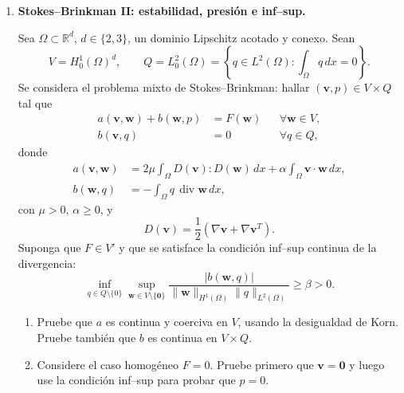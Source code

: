 \documentclass[11pt]{article}
\newcommand{\R}{\mathbb{R}}
\DeclareMathOperator{\diver}{div}
\begin{document}
\begin{enumerate}[label=\textbf{\arabic*.}, leftmargin=*]

\item \textbf{Stokes--Brinkman II: estabilidad, presi\'on e inf--sup.}

Sea $\Omega\subset\R^d$, $d\in\{2,3\}$, un dominio Lipschitz acotado y conexo. Sean
\begin{equation*}
    V=H^1_0(\Omega)^d,
    \qquad
    Q=L^2_0(\Omega)=\left\{q\in L^2(\Omega):\int_\Omega q\,dx=0\right\}.
\end{equation*}
Se considera el problema mixto de Stokes--Brinkman: hallar $(\bm v,p)\in V\times Q$ tal que
\begin{equation*}
\begin{aligned}
    a(\bm v,\bm w)+b(\bm w,p)&=F(\bm w) &&\forall\bm w\in V,\\
    b(\bm v,q)&=0 &&\forall q\in Q,
\end{aligned}
\end{equation*}
donde
\begin{equation*}
\begin{aligned}
    a(\bm v,\bm w)
    &=2\mu\int_\Omega D(\bm v):D(\bm w)\,dx
      +\alpha\int_\Omega \bm v\cdot\bm w\,dx,\\
    b(\bm w,q)&=-\int_\Omega q\,\diver\bm w\,dx,
\end{aligned}
\end{equation*}
con $\mu>0$, $\alpha\ge0$, y
\begin{equation*}
    D(\bm v)=\frac12(\nabla\bm v+\nabla\bm v^T).
\end{equation*}
Suponga que $F\in V'$ y que se satisface la condici\'on inf--sup continua de la divergencia:
\begin{equation*}
    \inf_{q\in Q\setminus\{0\}}
    \sup_{\bm w\in V\setminus\{\bm0\}}
    \frac{|b(\bm w,q)|}{\|\bm w\|_{H^1(\Omega)}\|q\|_{L^2(\Omega)}}
    \ge \beta>0.
\end{equation*}

\begin{enumerate}[label=(\alph*), leftmargin=*]
    \item Pruebe que $a$ es continua y coerciva en $V$, usando la desigualdad de Korn. Pruebe tambi\'en que $b$ es continua en $V\times Q$.

    \item Considere el caso homog\'eneo $F=0$. Pruebe primero que $\bm v=\bm0$ y luego use la condici\'on inf--sup para probar que $p=0$.


\end{enumerate}
\end{enumerate}
\end{document}
